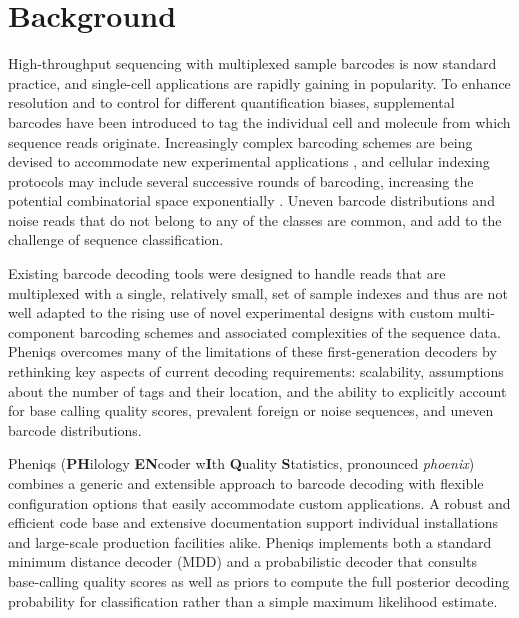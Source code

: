 \documentclass[10pt,twocolumn]{article}
\begin{document}
\section*{Background}
High-throughput sequencing with multiplexed sample barcodes is now standard practice, and single-cell applications are rapidly gaining in popularity. To enhance resolution and to control for different quantification biases, supplemental barcodes have been introduced to tag the individual cell and molecule from which sequence reads originate. Increasingly complex barcoding schemes are being devised to accommodate new experimental applications \citep{doi:10.1038/s41576-019-0093-7}, and cellular indexing protocols may include several successive rounds of barcoding, increasing the potential combinatorial space exponentially \citep{doi:10.1126/science.aam8940}. Uneven barcode distributions and noise reads that do not belong to any of the classes are common, and add to the challenge of sequence classification.

Existing barcode decoding tools were designed to handle reads that are multiplexed with a single, relatively small, set of sample indexes and thus are not well adapted to the rising use of novel experimental designs with custom multi-component barcoding schemes and associated complexities of the sequence data. Pheniqs overcomes many of the limitations of these first-generation decoders by rethinking key aspects of current decoding requirements: scalability, assumptions about the number of tags and their location, and the ability to explicitly account for base calling quality scores, prevalent foreign or noise sequences, and uneven barcode distributions.

Pheniqs (\textbf{PH}ilology \textbf{EN}coder w\textbf{I}th \textbf{Q}uality \textbf{S}tatistics, pronounced \textit{phoenix}) combines a generic and extensible approach to barcode decoding with flexible configuration options that easily accommodate custom applications. A robust and efficient code base and extensive documentation support individual installations and large-scale production facilities alike. Pheniqs implements both a standard minimum distance decoder (MDD) and a probabilistic decoder that consults base-calling quality scores as well as priors to compute the full posterior decoding probability for classification rather than a simple maximum likelihood estimate.
\end{document}
